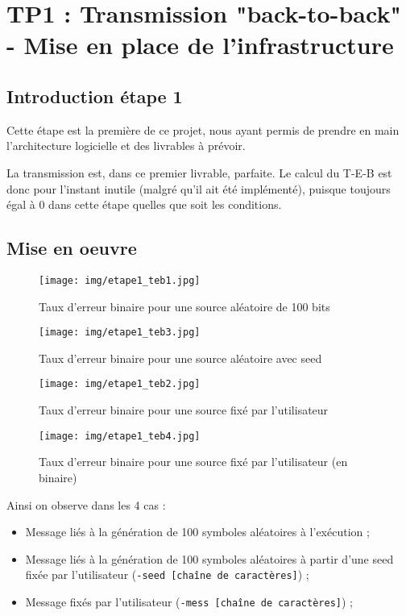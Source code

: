 \section{TP1 : Transmission "back-to-back" - Mise en place de l'infrastructure}

\subsection{Introduction étape 1}


Cette étape est la première de ce projet, nous ayant permis de prendre en main l'architecture logicielle et des livrables à prévoir.

La transmission est, dans ce premier livrable, parfaite. Le calcul du T-E-B est donc pour l'instant inutile (malgré qu'il ait été implémenté), puisque toujours égal à 0 dans cette étape quelles que soit les conditions.

\subsection{Mise en oeuvre}


\begin{figure}[H]
    \centering
    \texttt{[image: img/etape1\_teb1.jpg]}
    \caption{Taux d'erreur binaire pour une source aléatoire de 100 bits}
    \label{fig:teb1}
\end{figure}
\begin{figure}[H]
    \centering
    \texttt{[image: img/etape1\_teb3.jpg]}
    \caption{Taux d'erreur binaire pour une source aléatoire avec seed}
    \label{fig:teb2}
\end{figure}
\begin{figure}[H]
    \centering
    \texttt{[image: img/etape1\_teb2.jpg]}
    \caption{Taux d'erreur binaire pour une source fixé par l'utilisateur}
    \label{fig:teb3}
\end{figure}
\begin{figure}[H]
    \centering
    \texttt{[image: img/etape1\_teb4.jpg]}
    \caption{Taux d'erreur binaire pour une source fixé par l'utilisateur (en binaire)}
    \label{fig:teb4}
\end{figure}


Ainsi on observe dans les 4 cas :
\begin{itemize}
    \item Message liés à la génération de 100 symboles aléatoires à l'exécution ;
    \item Message liés à la génération de 100 symboles aléatoires à partir d'une seed fixée par l'utilisateur (\texttt{-seed [chaîne de caractères]}) ;
    \item Message fixés par l'utilisateur (\texttt{-mess [chaîne de caractères]}) ;
\end{itemize}

